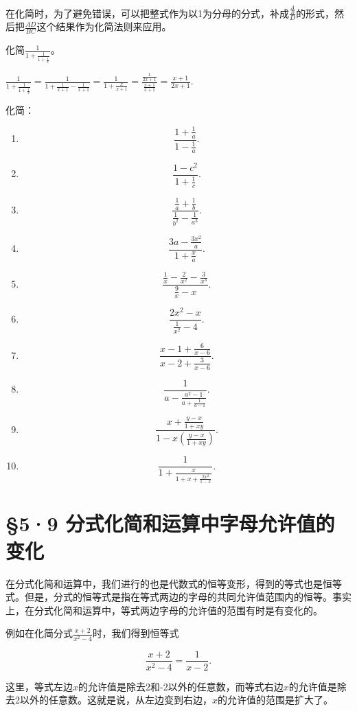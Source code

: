 在化简时，为了避免错误，可以把整式作为以1为分母的分式，补成\(\frac{\frac{A}{B}}{D}\)的形式，然后把\(\frac{AD}{BC}\)这个结果作为化简法则来应用。

 化简\(\frac{1}{1 + \frac{1}{1 + \frac{1}{x}}}\)。

\(\frac{1}{1 + \frac{1}{1 + \frac{1}{x}}} = \frac{1}{1 + \frac{1}{x + 1} - \frac{1}{x + 1}} = \frac{1}{1 + \frac{x}{x + 1}}\)\(= \frac{\frac{1}{2x + 1}}{\frac{x + 1}{x + 1}} = \frac{x + 1}{2x + 1}.\)

化简：


\begin{enumerate}[start=1]
\item
\[
\frac{1 + \frac{1}{a}}{1 - \frac{1}{a}}.
\]
\item
\[
\frac{1 - c ^{2}}{1 + \frac{1}{c}}.
\]
\item
\[
\frac{\frac{1}{a} + \frac{1}{b}}{\frac{1}{b ^{2}} - \frac{1}{a ^{3}}}.
\]
\item
\[
\frac{3 a - \frac{3 x ^{2}}{a}}{1 + \frac{x}{a}}.
\]
\item
\[
\frac{\frac{1}{x} - \frac{2}{x ^{2}} - \frac{3}{x ^{3}}}{\frac{9}{x} - x}.
\]
\item
\[
\frac{2 x ^{2} - x}{\frac{1}{x ^{2}} - 4}.
\]
\item
\[
\frac{x - 1 + \frac{6}{x - 6}}{x - 2 + \frac{3}{x - 6}}.
\]
\item
\[
\frac{1}{a - \frac{a ^{2} - 1}{a + \frac{1}{a - 1}}}.
\]
\item
\[
\frac{x + \frac{y - x}{1 + x y}}{1 - x \left(\frac{y - x}{1 + x y}\right)}.
\]
\item
\[
\frac{1}{1 + \frac{x}{1 + x + \frac{2 x ^{2}}{1 - x}}}.
\]
\end{enumerate}
\section{§5·9 分式化简和运算中字母允许值的变化}

在分式化简和运算中，我们进行的也是代数式的恒等变形，得到的等式也是恒等式。但是，分式的恒等式是指在等式两边的字母的共同允许值范围内的恒等。事实上，在分式化简和运算中，等式两边字母的允许值的范围有时是有变化的。

例如在化简分式\(\frac{x + 2}{x^2 - 4}\)时，我们得到恒等式

\[
\frac{x + 2}{x ^{2} - 4} = \frac{1}{x - 2}.
\]

这里，等式左边\(x\)的允许值是除去2和-2以外的任意数，而等式右边\(x\)的允许值是除去2以外的任意数。这就是说，从左边变到右边，\(x\)的允许值的范围是扩大了。


